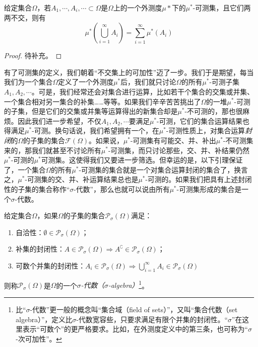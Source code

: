 \documentclass[main.tex]{subfiles}
\begin{document}
\begin{lemma}
    给定集合$\Omega$，若$A_1,\cdots,A_i,\cdots\subset\Omega$是$\Omega$上的一个外测度$\mu*$下的$\mu^*$-可测集，且它们两两不交，则有
    \[\mu^*\left(\bigcup_{i=1}^\infty A_i\right)=\sum_{i=1}^\infty\mu^*\left(A_i\right)\]
\end{lemma}
\begin{proof}
    待补充。%
\end{proof}

有了可测集的定义，我们朝着“不交集上的可加性”迈了一步。我们于是期望，每当我们为一个集合$\Omega$定义了一个外测度$\mu^*$后，我们就只讨论$\Omega$的所有$\mu^*$-可测子集$A_1,A_2,\cdots$。可是，我们经常还会对集合进行运算，比如若干个集合的交集或并集、一个集合相对另一集合的补集……等等。如果我们辛辛苦苦挑出了$\Omega$的一堆$\mu^*$-可测的子集，但是它们的交集或并集等运算得出的新集合却是$\mu^*$-不可测的，那也很麻烦。因此我们进一步希望，不仅$A_1,A_2,\cdots$要满足$\mu^*$-可测，它们的集合运算结果也得满足$\mu^*$-可测。换句话说，我们希望拥有一个，在$\mu^*$-可测性质上，对集合运算\emph{封闭}的$\Omega$的子集的集合$\mathcal{F}\left(\Omega\right)$。如果说，$\mu^*$-可测集有可能交、并、补出$\mu^*$-不可测集来的，那我们就甚至不讨论所有$\mu^*$-可测集，而只讨论那些，交、并、补结果仍然$\mu^*$-可测的$\mu^*$可测集。这使得我们又要进一步筛选。但幸运的是，以下引理保证了，一个集合$\Omega$的所有$\mu^*$-可测集的集合就是一个对集合运算封闭的集合了，换言之，$\mu^*$-可测集的交、并、补运算结果总也是$\mu^*$-可测的。如果我们把具有上述封闭性的子集的集合称作“$\sigma$-代数”，那么也就可以说由所有$\mu^*$-可测集形成的集合是一个$\sigma$-代数。

\begin{definition}[$\sigma$-代数]
    给定集合$\Omega$，如果$\Omega$的子集的集合$\mathcal{P}_{\sigma}\left(\Omega\right)$满足：
    \begin{enumerate}
        \item 自洽性：$\emptyset\in\mathcal{P}_\sigma\left(\Omega\right)$；
        \item 补集的封闭性：$A\in\mathcal{P}_\sigma\left(\Omega\right)\Rightarrow A^\complement\in\mathcal{P}_\sigma\left(\Omega\right)$；
        \item 可数个并集的封闭性：$A_i\in\mathcal{P}_\sigma\left(\Omega\right)\Rightarrow\bigcup_{i=1}^\infty A_i\in\mathcal{P}_\sigma\left(\Omega\right)$
    \end{enumerate}
    则称$\mathcal{P}_\sigma\left(\Omega\right)$是$\Omega$的一个\emph{$\sigma$-代数（$\sigma$-algebra）}\footnote{比“$\sigma$-代数”更一般的概念叫“集合域（field of sets）”，又叫“集合代数（set algebra）”，定义比$\sigma$-代数宽容些，只要求满足有限个并集的封闭性。“$\sigma$”在这里表示“可数个”的更严格要求。比如，在外测度定义中的第三条，也可称为“$\sigma$-次可加性”。}。
\end{definition}
\end{document}
